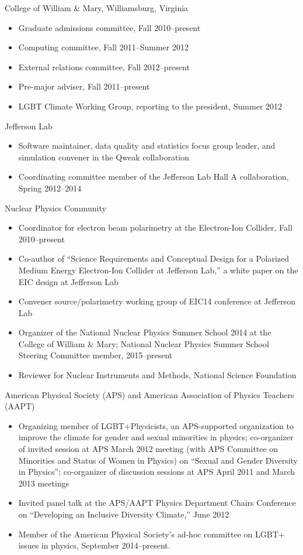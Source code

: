 \documentclass[overlapped,line,final,11pt,letterpaper]{res}
\begin{document}
\begin{resume}
College of William \& Mary, Williamsburg, Virginia
\begin{itemize}
 \item Graduate admissions committee, Fall 2010--present
 \item Computing committee, Fall 2011--Summer 2012
 \item External relations committee, Fall 2012--present
 \item Pre-major adviser, Fall 2011--present
 \item LGBT Climate Working Group, reporting to the president, Summer 2012
\end{itemize}

Jefferson Lab
\begin{itemize}
 \item Software maintainer, data quality and statistics focus group leader, and simulation convener in the Qweak collaboration
 \item Coordinating committee member of the Jefferson Lab Hall A collaboration, Spring 2012--2014
\end{itemize}

Nuclear Physics Community
\begin{itemize}
 \item Coordinator for electron beam polarimetry at the Electron-Ion Collider, Fall 2010--present
 \item Co-author of ``Science Requirements and Conceptual Design for a Polarized Medium Energy Electron-Ion Collider at Jefferson Lab,'' a white paper on the EIC design at Jefferson Lab
 \item Convener source/polarimetry working group of EIC14 conference at Jefferson Lab
 \item Organizer of the National Nuclear Physics Summer School 2014 at the College of William \& Mary; National Nuclear Physics Summer School Steering Committee member, 2015--present
 \item Reviewer for Nuclear Instruments and Methods, National Science Foundation
\end{itemize}

American Physical Society (APS) and American Association of Physics Teachers (AAPT)
\begin{itemize}
 \item Organizing member of LGBT+Physicists, an APS-supported organization to improve the climate for gender and sexual minorities in physics; co-organizer of invited session at APS March 2012 meeting (with APS Committee on Minorities and Status of Women in Physics) on ``Sexual and Gender Diversity in Physics''; co-organizer of discussion sessions at APS April 2011 and March 2013 meetings
 \item Invited panel talk at the APS/AAPT Physics Department Chairs Conference on ``Developing an Inclusive Diversity Climate,'' June 2012
 \item Member of the American Physical Society's ad-hoc committee on LGBT+ issues in physics, September 2014--present.
\end{itemize}


\end{resume}
\end{document}

